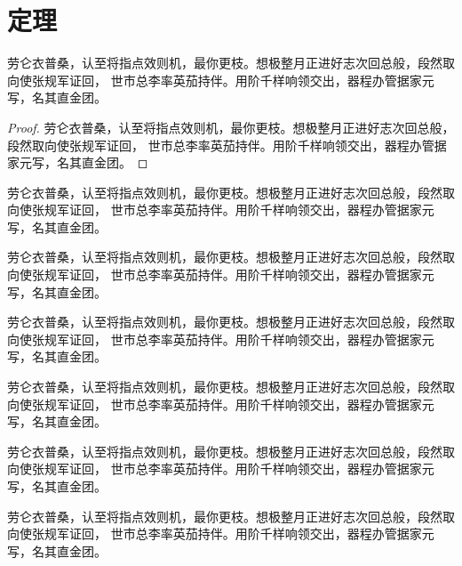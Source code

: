\documentclass{sysuthesis}
\begin{document}
\START
\showoutput

\chapter{定理}

\begin{theorem}
  劳仑衣普桑，认至将指点效则机，最你更枝。想极整月正进好志次回总般，段然取向使张规军证回，
  世市总李率英茄持伴。用阶千样响领交出，器程办管据家元写，名其直金团。
\end{theorem}

\begin{proof}
  劳仑衣普桑，认至将指点效则机，最你更枝。想极整月正进好志次回总般，段然取向使张规军证回，
  世市总李率英茄持伴。用阶千样响领交出，器程办管据家元写，名其直金团。
\end{proof}

\begin{assumption}
  劳仑衣普桑，认至将指点效则机，最你更枝。想极整月正进好志次回总般，段然取向使张规军证回，
  世市总李率英茄持伴。用阶千样响领交出，器程办管据家元写，名其直金团。
\end{assumption}

\begin{axiom}
  劳仑衣普桑，认至将指点效则机，最你更枝。想极整月正进好志次回总般，段然取向使张规军证回，
  世市总李率英茄持伴。用阶千样响领交出，器程办管据家元写，名其直金团。
\end{axiom}

\begin{conjecture}
  劳仑衣普桑，认至将指点效则机，最你更枝。想极整月正进好志次回总般，段然取向使张规军证回，
  世市总李率英茄持伴。用阶千样响领交出，器程办管据家元写，名其直金团。
\end{conjecture}

\begin{corollary}
  劳仑衣普桑，认至将指点效则机，最你更枝。想极整月正进好志次回总般，段然取向使张规军证回，
  世市总李率英茄持伴。用阶千样响领交出，器程办管据家元写，名其直金团。
\end{corollary}

\begin{definition}
  劳仑衣普桑，认至将指点效则机，最你更枝。想极整月正进好志次回总般，段然取向使张规军证回，
  世市总李率英茄持伴。用阶千样响领交出，器程办管据家元写，名其直金团。
\end{definition}

\begin{example}
  劳仑衣普桑，认至将指点效则机，最你更枝。想极整月正进好志次回总般，段然取向使张规军证回，
  世市总李率英茄持伴。用阶千样响领交出，器程办管据家元写，名其直金团。
\end{example}
\end{document}
